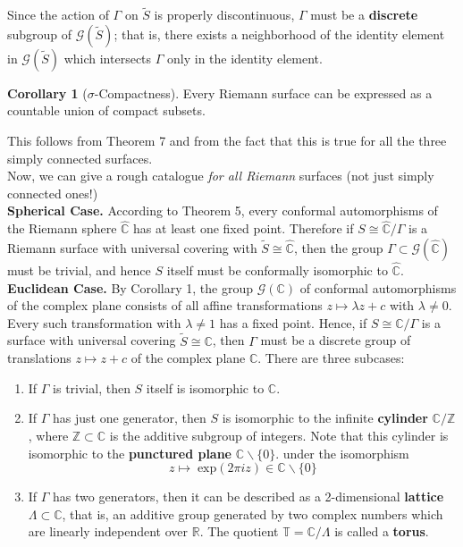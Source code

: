\documentclass{article}
\theoremstyle{definition}
\newtheorem{corollary}{Corollary}
\begin{document}
    Since the action of $\Gamma$ on $\tilde{S}$ is properly discontinuous, $\Gamma$ must be a \textbf{discrete} subgroup of
    $\mathcal{G}(\tilde{S})$; that is, there exists a neighborhood of the identity element in $\mathcal{G}(\tilde{S})$ which
    intersects $\Gamma$ only in the identity element.

    \begin{corollary}[$\sigma$-Compactness]
        Every Riemann surface can be expressed as a countable union of compact subsets.
    \end{corollary}

    This follows from Theorem 7 and from the fact that this is true for all the three simply connected surfaces.\\

    Now, we can give a rough catalogue \textit{for all Riemann} surfaces (not just simply connected ones!)\\

    \textbf{Spherical Case.} According to Theorem 5, every conformal automorphisms of the Riemann sphere $\hat{\mathbb{C}}$ has
    at least one fixed point. Therefore if $S\cong\hat{\mathbb{C}}/\Gamma$ is a Riemann surface with universal covering with
    $\tilde{S}\cong\hat{\mathbb{C}}$, then the group $\Gamma\subset\mathcal{G}(\hat{\mathbb{C}})$ must be trivial, and hence $S$
    itself must be conformally isomorphic to $\hat{\mathbb{C}}$.\\

    \textbf{Euclidean Case.} By Corollary 1, the group $\mathcal{G}(\mathbb{C})$ of conformal automorphisms of the complex plane
    consists of all affine transformations $z\mapsto \lambda z +c$ with $\lambda\neq 0$. Every such transformation with $\lambda\neq 1$
    has a fixed point. Hence, if $S\cong \mathbb{C}/\Gamma$ is a surface with universal covering $\tilde{S}\cong\mathbb{C}$, then
    $\Gamma$ must be a discrete group of translations $z\mapsto z+c$ of the complex plane $\mathbb{C}$. There are three subcases:
    \begin{enumerate}
        \item If $\Gamma$ is trivial, then $S$ itself is isomorphic to $\mathbb{C}$.
        \item If $\Gamma$ has just one generator, then $S$ is isomorphic to the infinite \textbf{cylinder} $\mathbb{C}/\mathbb{Z}$,
            where $\mathbb{Z}\subset\mathbb{C}$ is the additive subgroup of integers. Note that this cylinder is isomorphic
            to the \textbf{punctured plane} $\mathbb{C}\backslash\{0\}$. under the isomorphism
            \[ z\mapsto\;\text{exp}(2\pi iz)\in\mathbb{C}\backslash\{0\} \]
        \item If $\Gamma$ has two generators, then it can be described as a 2-dimensional \textbf{lattice} $\Lambda\subset\mathbb{C}$,
            that is, an additive group generated by two complex numbers which are linearly independent over $\mathbb{R}$. The
            quotient $\mathbb{T}=\mathbb{C}/\Lambda$ is called a \textbf{torus}.
    \end{enumerate}
\end{document}
